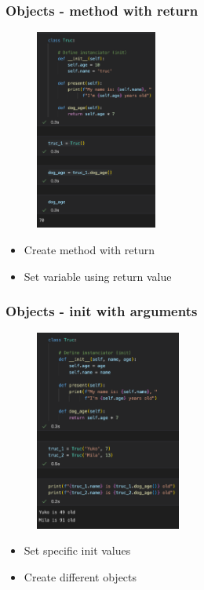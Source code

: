 \begin{frame}\frametitle{Objects - method with return}
   \begin{minipage}{0.4\linewidth}
      \begin{figure}[H]
         \includegraphics[width=4cm]{../images/illustrations/object_return.png}
      \end{figure}
   \end{minipage}
   \begin{minipage}{0.58\linewidth}
      \begin{itemize}
         \item Create method with return
         \item Set variable using return value
      \end{itemize}
   \end{minipage}
\end{frame}


\begin{frame}\frametitle{Objects - init with arguments}
   \begin{minipage}{0.48\linewidth}
      \begin{figure}[H]
         \includegraphics[width=4.8cm]{../images/illustrations/object_init_arguments.png}
      \end{figure}
   \end{minipage}
   \begin{minipage}{0.48\linewidth}
      \begin{itemize}
         \item Set specific init values
         \item Create different objects
      \end{itemize}
   \end{minipage}
\end{frame}


